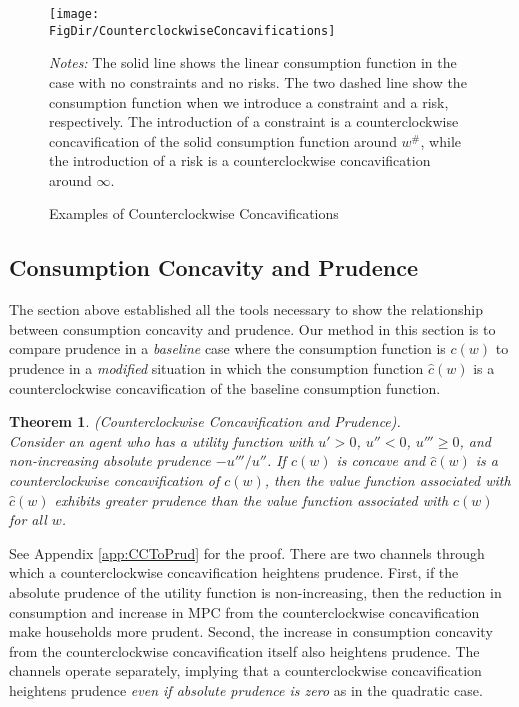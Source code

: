 \documentclass[titlepage]{\econtex}
\newtheorem{theorem}{Theorem}
\begin{document}
\hypertarget{CounterclockwiseConcavifications}{}

\begin{figure}[ht]
	{\centering
	\texttt{[image: \\FigDir/CounterclockwiseConcavifications]}}
	\caption{Examples of Counterclockwise Concavifications}
	{\footnotesize \begin{singlespace} {\emph{Notes:} The solid line shows the linear consumption function in the case with no constraints and no risks. The two dashed line show the consumption function when we introduce a constraint and a risk, respectively. The introduction of a constraint is a counterclockwise concavification of the solid consumption function around $w^{\#}$, while the introduction of a risk is a counterclockwise concavification around $\infty$.}  \end{singlespace}}
	\label{fig:counterclockwise}
\end{figure}







\subsection{Consumption Concavity and Prudence}
The section above established all the tools necessary to show the relationship between consumption concavity and prudence.
Our method in this section is to compare prudence in a \textit{baseline} case where the consumption function is $c(w)$ to prudence in a \textit{modified} situation in which the consumption function $\hat{c}(w)$ is a counterclockwise concavification of the baseline consumption function.


\begin{theorem}\label{thm:CCToPrud}  (Counterclockwise Concavification and Prudence). \\
	Consider an agent who has a utility function %
	with $u' > 0$, $u'' < 0$, $u''' \geq 0$, and non-increasing absolute prudence $-u'''/u''$. If $c(w)$ is concave and $\hat{c}(w)$ is a counterclockwise concavification of $c(w)$, then the value function associated with $\hat{c}(w)$ exhibits greater prudence than the value function associated with $c(w)$ for all $w$.
\end{theorem}
\noindent See Appendix \ref{app:CCToPrud} for the proof.
There are two channels through which a counterclockwise concavification heightens prudence. First, if the absolute prudence of the utility function is non-increasing, then the reduction in consumption and increase in MPC from the counterclockwise concavification make households more prudent. Second, the increase in consumption concavity from the counterclockwise concavification itself also heightens prudence. The channels operate separately, implying that a counterclockwise concavification heightens prudence \textit{even if absolute prudence is zero} as in the quadratic case.
\end{document}
